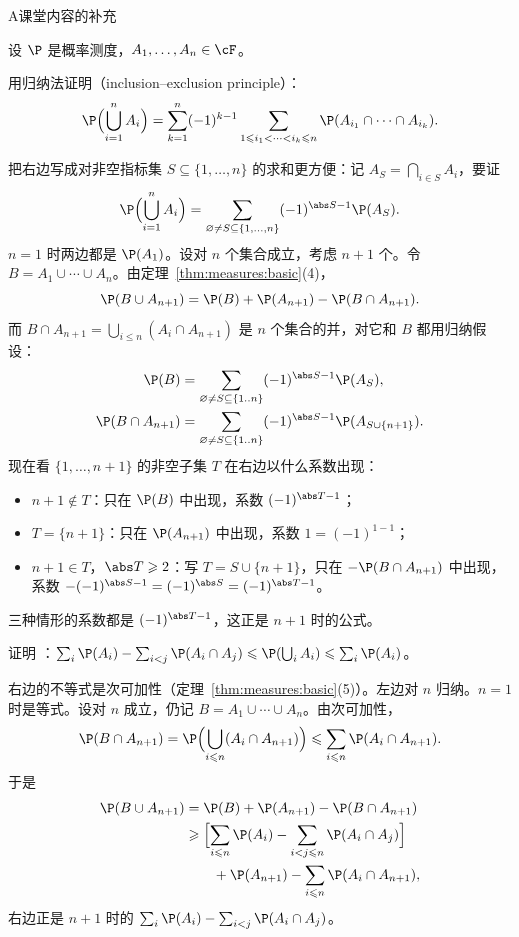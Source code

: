 \begin{exercises}{A}{课堂内容的补充}
\item\label{ex:measures:A2} 设 $\P$ 是概率测度，$A_1,\dots,A_n\in\cF$。
\begin{questions}
\item 用归纳法证明（inclusion–exclusion principle）：
\[
\P\Bigl(\bigcup_{i=1}^nA_i\Bigr)=\sum_{k=1}^n(-1)^{k-1}\sum_{1\leqslant i_1<\cdots<i_k\leqslant n}\P(A_{i_1}\cap\cdots\cap A_{i_k}).
\]
\begin{solution}
把右边写成对非空指标集 $S\subseteq\{1,\dots,n\}$ 的求和更方便：记 $A_S=\bigcap_{i\in S}A_i$，要证
\[
\P\Bigl(\bigcup_{i=1}^nA_i\Bigr)=\sum_{\varnothing\neq S\subseteq\{1,\dots,n\}}(-1)^{\abs S-1}\P(A_S).
\]
$n=1$ 时两边都是 $\P(A_1)$。设对 $n$ 个集合成立，考虑 $n+1$ 个。令 $B=A_1\cup\cdots\cup A_n$。由定理~\ref{thm:measures:basic}(4)，
\[
\P(B\cup A_{n+1})=\P(B)+\P(A_{n+1})-\P(B\cap A_{n+1}).
\]
而 $B\cap A_{n+1}=\bigcup_{i\leqslant n}(A_i\cap A_{n+1})$ 是 $n$ 个集合的并，对它和 $B$ 都用归纳假设：
\[
\begin{aligned}
\P(B)&=\sum_{\varnothing\neq S\subseteq\{1..n\}}(-1)^{\abs S-1}\P(A_S),\\
\P(B\cap A_{n+1})&=\sum_{\varnothing\neq S\subseteq\{1..n\}}(-1)^{\abs S-1}\P(A_{S\cup\{n+1\}}).
\end{aligned}
\]
现在看 $\{1,\dots,n+1\}$ 的非空子集 $T$ 在右边以什么系数出现：
\begin{itemize}
\item $n+1\notin T$：只在 $\P(B)$ 中出现，系数 $(-1)^{\abs T-1}$；
\item $T=\{n+1\}$：只在 $\P(A_{n+1})$ 中出现，系数 $1=(-1)^{1-1}$；
\item $n+1\in T$，$\abs T\geqslant2$：写 $T=S\cup\{n+1\}$，只在 $-\P(B\cap A_{n+1})$ 中出现，系数 $-(-1)^{\abs S-1}=(-1)^{\abs S}=(-1)^{\abs T-1}$。
\end{itemize}
三种情形的系数都是 $(-1)^{\abs T-1}$，这正是 $n+1$ 时的公式。
\end{solution}
\item 证明 ：$\sum_i\P(A_i)-\sum_{i<j}\P(A_i\cap A_j)\leqslant \P(\bigcup_iA_i)\leqslant\sum_i\P(A_i)$。
\begin{solution}
右边的不等式是次可加性（定理~\ref{thm:measures:basic}(5)）。左边对 $n$ 归纳。$n=1$ 时是等式。设对 $n$ 成立，仍记 $B=A_1\cup\cdots\cup A_n$。由次可加性，
\[
\P(B\cap A_{n+1})=\P\Bigl(\bigcup_{i\leqslant n}(A_i\cap A_{n+1})\Bigr)\leqslant\sum_{i\leqslant n}\P(A_i\cap A_{n+1}).
\]
于是
\[
\begin{aligned}
\P(B\cup A_{n+1})&=\P(B)+\P(A_{n+1})-\P(B\cap A_{n+1})\\
&\geqslant\Bigl[\sum_{i\leqslant n}\P(A_i)-\sum_{i<j\leqslant n}\P(A_i\cap A_j)\Bigr]\\
&\qquad+\P(A_{n+1})-\sum_{i\leqslant n}\P(A_i\cap A_{n+1}),
\end{aligned}
\]
右边正是 $n+1$ 时的 $\sum_i\P(A_i)-\sum_{i<j}\P(A_i\cap A_j)$。


\end{solution}
\end{questions}
\end{exercises}
